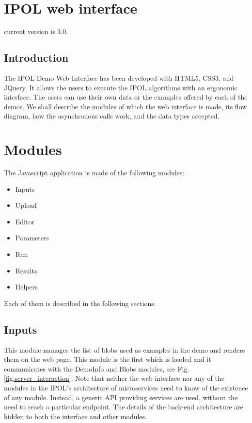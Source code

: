 \section{IPOL web interface}

current version is 3.0.

\subsection{Introduction}
The IPOL Demo Web Interface has been developed with HTML5, CSS3, and JQuery. 
It allows the users to execute the IPOL algorithms with an ergonomic interface. The users can use their own data or the examples offered by each of the demos. We shall describe the modules of which the web interface is made, its flow diagram, how the asynchronous calls work, and the data types accepted.

\section{Modules}
The Javascript application is made of the following modules:

\begin{itemize}
	\item Inputs
	\item Upload
	\item Editor
	\item Parameters
	\item Run
	\item Results
	\item Helpers 
\end{itemize}

Each of them is described in the following sections.

\subsection{Inputs}
This module manages the list of blobs used as examples in the demo and renders them on the web page. This module is the first which is loaded and it communicates with the DemoInfo and Blobs modules, see Fig. \ref{fig:server_interaction}. Note that neither the web interface nor any of the modules in the IPOL's architecture of microservices need to know of the existence of any module. Instead, a generic API providing services are used, without the need to reach a particular endpoint. The details of the back-end architecture are hidden to both the interface and other modules.

